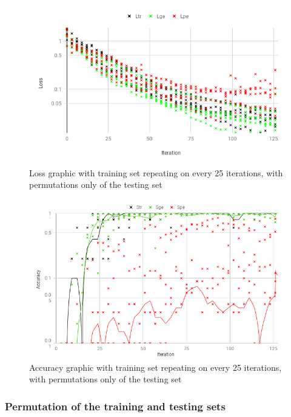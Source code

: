 \begin{enumerate}[label=(\Alph*)]
        \begin{figure}[H]
            \centering
            \includegraphics[width=.9\linewidth]{fig/content/results/shortest_path/epochs_base.png}
            \caption{Loss graphic with training set repeating on every 25 iterations, with permutations only of the testing set}
            \label{fig:shotest_paths_base_epochs_results}
        \end{figure}
        
        \begin{figure}[H]
            \centering
            \includegraphics[width=.9\linewidth]{fig/content/results/shortest_path/epochs_base_ACC.png}
            \caption{Accuracy graphic with training set repeating on every 25 iterations, with permutations only of the testing set}
            \label{fig:shotest_paths_base_epochs_ACC_results}
        \end{figure}

    \end{enumerate}

\subsubsection {Permutation of the training and testing sets}

